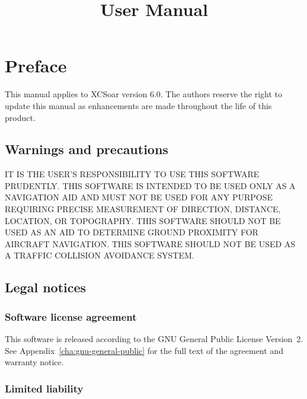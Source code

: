\documentclass[a4paper,12pt]{refrep}
\title{User Manual}
\begin{document}
\maketitle

\listoftodos

  
\begingroup
\setlength{\parskip}{0.1\baselineskip}
\tableofcontents
\endgroup


\chapter*{Preface}

This manual applies to XCSoar version 6.0.  The authors reserve the
right to update this manual as enhancements are made throughout the
life of this product.

\section*{Warnings and precautions}

\warning IT IS THE USER'S RESPONSIBILITY TO USE THIS SOFTWARE PRUDENTLY. THIS
SOFTWARE IS INTENDED TO BE USED ONLY AS A NAVIGATION AID AND MUST NOT
BE USED FOR ANY PURPOSE REQUIRING PRECISE MEASUREMENT OF DIRECTION,
DISTANCE, LOCATION, OR TOPOGRAPHY. THIS SOFTWARE SHOULD NOT BE USED AS
AN AID TO DETERMINE GROUND PROXIMITY FOR AIRCRAFT NAVIGATION.
THIS SOFTWARE SHOULD NOT BE USED AS A TRAFFIC COLLISION AVOIDANCE SYSTEM.


\section*{Legal notices}

\subsection*{Software license agreement}

This software is released according to the GNU General Public License
Version~2.  See Appendix~\ref{cha:gnu-general-public} for the full
text of the agreement and warranty notice.

\subsection*{Limited liability}
\end{document}
